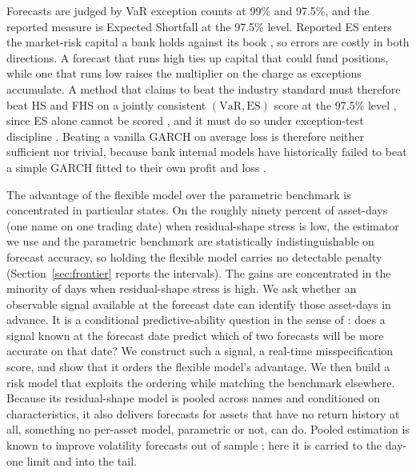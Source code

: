 \documentclass[11pt]{article}
\newcommand{\VaR}{\mathrm{VaR}}
\newcommand{\ES}{\mathrm{ES}}
\theoremstyle{remark}
\begin{document}
Forecasts are judged by VaR exception counts at 99\% and 97.5\%, and the reported measure is Expected Shortfall at the 97.5\% level. Reported ES enters the market-risk capital a bank holds against its book \citep{bcbs2019frtb}, so errors are costly in both directions. A forecast that runs high ties up capital that could fund positions, while one that runs low raises the multiplier on the charge as exceptions accumulate. A method
that claims to beat the industry standard must therefore beat HS and FHS
on a jointly consistent $(\VaR,\ES)$ score at the 97.5\% level
\citep{fissler2016}, since ES alone cannot be scored \citep{gneiting2011},
and it must do so under exception-test discipline
\citep{noldeziegel2017elicitability}. Beating a vanilla GARCH on average loss is therefore neither sufficient nor trivial, because bank
internal models have historically failed to beat a simple GARCH fitted
to their own profit and loss \citep{berkowitzobrien2002}.

The advantage of the flexible model over the parametric benchmark is concentrated in particular states. On the roughly ninety percent of asset-days (one name on one trading date) when residual-shape stress is low, the estimator we use and the parametric benchmark are statistically indistinguishable on forecast accuracy, so holding the flexible model carries no detectable penalty (Section~\ref{sec:frontier} reports the intervals). The gains are concentrated in the minority of days
when residual-shape stress is high. We ask whether an observable signal available at the forecast date can identify those asset-days in advance. It is a
conditional predictive-ability question in the sense of
\citet{giacominiwhite2006}: does a signal known at the forecast date
predict which of two forecasts will be more accurate on that date? We
construct such a signal, a real-time misspecification score, and show
that it orders the flexible model's advantage. We then build a risk model that exploits the
ordering while matching the benchmark elsewhere. Because its
residual-shape model is pooled across names and conditioned on
characteristics, it also delivers forecasts for assets that have no
return history at all, something no per-asset model, parametric or not,
can do. Pooled estimation is known to improve volatility forecasts out
of sample \citep{bollerslev2018risk, zhang2024commonality}; here it is
carried to the day-one limit and into the tail.
\end{document}
